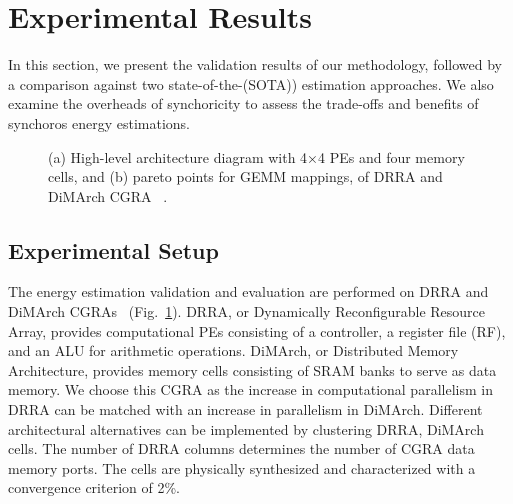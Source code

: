 \section{Experimental Results}
In this section, we present the validation results of our
methodology, followed by a comparison against two state-of-the-(SOTA)) estimation approaches. 
We also examine the overheads of synchoricity to assess the trade-offs and benefits of synchoros energy estimations.
\begin{figure}[h]
    \centering

    \begin{subfigure}{0.48\textwidth}
        \centering
        \scriptsize
        
        \caption{\small}
        \label{fig:arch}
    \end{subfigure}
    \begin{subfigure}{0.48\textwidth}
        \centering
        
        \caption{\small}
        \label{fig:pareto}
    \end{subfigure}

    \caption{\small (a) High-level architecture diagram with 4×4 PEs and four memory cells, and (b) pareto points for GEMM mappings, of DRRA and DiMArch CGRA ~\cite{hemani2017synchoricity,pudi2024integer,pudi2024application}.}
    \label{fig:combined}
\end{figure}
\subsection{Experimental Setup}
The energy estimation validation and evaluation are performed on DRRA and DiMArch CGRAs~\cite{hemani2017synchoricity,pudi2024integer,pudi2024application} (Fig.~\ref {fig:arch}). 
DRRA, or Dynamically Reconfigurable Resource Array, provides computational PEs consisting of a controller, a register file (RF), and an ALU for arithmetic operations.
DiMArch, or Distributed Memory Architecture, provides memory cells consisting of SRAM banks to serve as data memory. 
We choose this CGRA as the increase in computational parallelism in DRRA can be matched with an increase in parallelism in DiMArch. 
Different architectural alternatives can be implemented by clustering DRRA, DiMArch cells.
The number of DRRA columns determines the number of CGRA data memory ports.
The cells are physically synthesized and characterized with a convergence criterion of 2\%.

